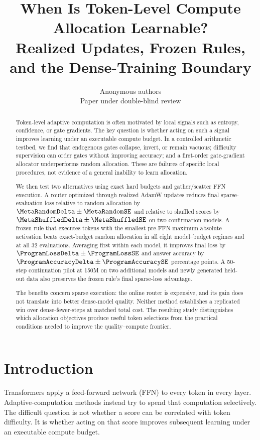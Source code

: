 \documentclass{article}
\title{When Is Token-Level Compute Allocation Learnable?\\
Realized Updates, Frozen Rules, and the Dense-Training Boundary}
\author{Anonymous authors\\
Paper under double-blind review}
\begin{document}
\maketitle

\begin{abstract}
Token-level adaptive computation is often motivated by local signals such as
entropy, confidence, or gate gradients. The key question is whether acting on
such a signal improves learning under an executable compute budget. In a
controlled arithmetic testbed, we find that endogenous gates collapse, invert,
or remain vacuous; difficulty supervision can order gates without improving
accuracy; and a first-order gate-gradient allocator underperforms random
allocation. These are failures of specific local procedures, not evidence of a
general inability to learn allocation.

We then test two alternatives using exact hard budgets and gather/scatter FFN
execution. A router optimized through realized AdamW updates reduces final
sparse-evaluation loss relative to random allocation by
$\MetaRandomDelta\pm\MetaRandomSE$ and relative to shuffled scores by
$\MetaShuffledDelta\pm\MetaShuffledSE$ on two confirmation models. A frozen
rule that executes tokens with the smallest pre-FFN maximum absolute activation
beats exact-budget random allocation in all eight model--budget regimes and at
all 32 evaluations. Averaging first within each model, it improves final loss
by $\ProgramLossDelta\pm\ProgramLossSE$ and answer accuracy by
$\ProgramAccuracyDelta\pm\ProgramAccuracySE$ percentage points. A 50-step
continuation pilot at 150M on two additional models and newly generated
held-out data also preserves the frozen rule's final sparse-loss advantage.

The benefits concern sparse execution: the online router is expensive, and its
gain does not translate into better dense-model quality. Neither method
establishes a replicated win over dense-fewer-steps at matched total cost. The
resulting study distinguishes which allocation objectives produce useful token
selections from the practical conditions needed to improve the
quality--compute frontier.
\end{abstract}

\section{Introduction}
Transformers apply a feed-forward network (FFN) to every token in every layer.
Adaptive-computation methods instead try to spend that computation selectively.
The difficult question is not whether a score can be correlated with token
difficulty. It is whether acting on that score improves subsequent learning
under an executable compute budget.
\end{document}
